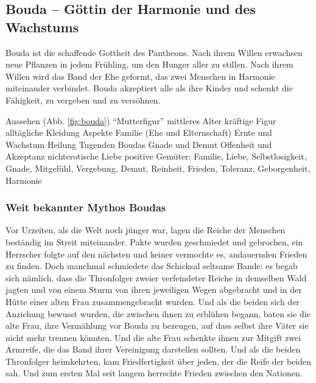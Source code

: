 \subsection{Bouda -- Göttin der Harmonie und des Wachstums}
Bouda ist die schaffende Gottheit des Pantheons. 
Nach ihrem Willen erwachsen neue Pflanzen in jedem Frühling, um den Hunger aller zu stillen. 
Nach ihrem Willen wird das Band der Ehe geformt, das zwei Menschen in Harmonie miteinander verbindet. 
Bouda akzeptiert alle als ihre Kinder und schenkt die Fähigkeit, zu vergeben und zu versöhnen.
\begin{outline}
	\1 Aussehen (Abb. \ref{fig:bouda})
		\2 ``Mutterfigur''
		\2 mittleres Alter 
		\2 kräftige Figur
		\2 alltägliche Kleidung 
	\1 Aspekte
		\2 Familie (Ehe und Elternschaft)
		\2 Ernte und Wachstum
		\2 Heilung
	\1 Tugenden Boudas
		\2 Gnade und Demut
		\2 Offenheit und Akzeptanz
		\2 nichterotische Liebe
	\1 positive Gemüter: Familie, Liebe, Selbstlosigkeit, Gnade, Mitgefühl, Vergebung, Demut, Reinheit, Frieden, Toleranz, Geborgenheit, Harmonie
\end{outline}

\subsubsection{Weit bekannter Mythos Boudas}
Vor Urzeiten, als die Welt noch jünger war, lagen die Reiche der Menschen beständig im Streit miteinander. 
Pakte wurden geschmiedet und gebrochen, ein Herrscher folgte auf den nächsten und keiner vermochte es, andauernden Frieden zu finden. 
Doch manchmal schmiedete das Schicksal seltsame Bande: 
es begab sich nämlich, dass die Thronfolger zweier verfeindeter Reiche in demselben Wald jagten und von einem Sturm von ihren jeweiligen Wegen abgebracht und in der Hütte einer alten Frau zusammengebracht wurden. 
Und als die beiden sich der Anziehung bewusst wurden, die zwischen ihnen zu erblühen begann, baten sie die alte Frau, ihre Vermählung vor Bouda zu bezeugen, auf dass selbst ihre Väter sie nicht mehr trennen könnten. 
Und die alte Frau schenkte ihnen zur Mitgift zwei Armreife, die das Band ihrer Vereinigung darstellen sollten. 
Und als die beiden Thronfolger heimkehrten, kam Friedfertigkeit über jeden, der die Reife der beiden sah. 
Und zum ersten Mal seit langem herrschte Frieden zwischen den Nationen.

